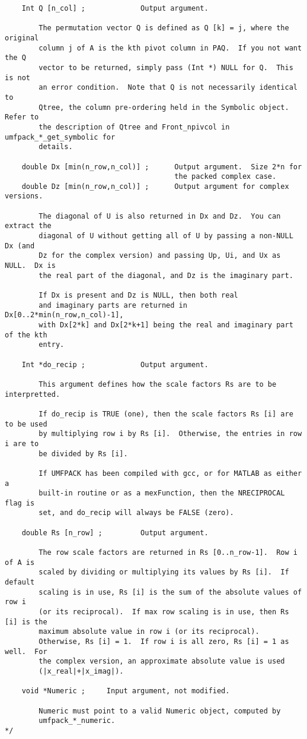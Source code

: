 \documentclass[11pt]{article}
\begin{document}
{\begin{verbatim}
    Int Q [n_col] ;             Output argument.

        The permutation vector Q is defined as Q [k] = j, where the original
        column j of A is the kth pivot column in PAQ.  If you not want the Q
        vector to be returned, simply pass (Int *) NULL for Q.  This is not
        an error condition.  Note that Q is not necessarily identical to
        Qtree, the column pre-ordering held in the Symbolic object.  Refer to
        the description of Qtree and Front_npivcol in umfpack_*_get_symbolic for
        details.

    double Dx [min(n_row,n_col)] ;      Output argument.  Size 2*n for
                                        the packed complex case.
    double Dz [min(n_row,n_col)] ;      Output argument for complex versions.

        The diagonal of U is also returned in Dx and Dz.  You can extract the
        diagonal of U without getting all of U by passing a non-NULL Dx (and
        Dz for the complex version) and passing Up, Ui, and Ux as NULL.  Dx is
        the real part of the diagonal, and Dz is the imaginary part.

        If Dx is present and Dz is NULL, then both real
        and imaginary parts are returned in Dx[0..2*min(n_row,n_col)-1],
        with Dx[2*k] and Dx[2*k+1] being the real and imaginary part of the kth
        entry.

    Int *do_recip ;             Output argument.

        This argument defines how the scale factors Rs are to be interpretted.

        If do_recip is TRUE (one), then the scale factors Rs [i] are to be used
        by multiplying row i by Rs [i].  Otherwise, the entries in row i are to
        be divided by Rs [i].

        If UMFPACK has been compiled with gcc, or for MATLAB as either a
        built-in routine or as a mexFunction, then the NRECIPROCAL flag is
        set, and do_recip will always be FALSE (zero).

    double Rs [n_row] ;         Output argument.

        The row scale factors are returned in Rs [0..n_row-1].  Row i of A is
        scaled by dividing or multiplying its values by Rs [i].  If default
        scaling is in use, Rs [i] is the sum of the absolute values of row i
        (or its reciprocal).  If max row scaling is in use, then Rs [i] is the
        maximum absolute value in row i (or its reciprocal).
        Otherwise, Rs [i] = 1.  If row i is all zero, Rs [i] = 1 as well.  For
        the complex version, an approximate absolute value is used
        (|x_real|+|x_imag|).

    void *Numeric ;     Input argument, not modified.

        Numeric must point to a valid Numeric object, computed by
        umfpack_*_numeric.
*/
\end{verbatim}
}
\end{document}
